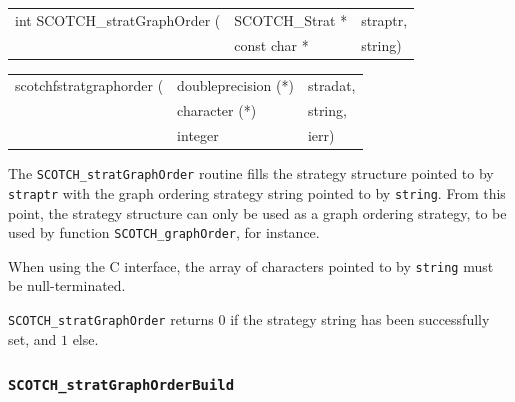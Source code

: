 \begin{itemize}
\progsyn

{\tt\begin{tabular}{l@{}ll}
int SCOTCH\_stratGraphOrder ( & SCOTCH\_Strat * & straptr, \\
                              & const char *    & string)
\end{tabular}}

{\tt\begin{tabular}{l@{}ll}
scotchfstratgraphorder ( & doubleprecision (*) & stradat, \\
                         & character (*)       & string,  \\
                         & integer             & ierr)
\end{tabular}}

\progdes

The {\tt SCOTCH\_stratGraphOrder} routine fills the strategy
structure pointed to by {\tt straptr} with the graph ordering
strategy string pointed to by {\tt string}. From this point,
the strategy structure can only be used as a graph ordering
strategy, to be used by function
{\tt SCOTCH\_\lbt graph\lbt Order}, for instance.

When using the C interface, the array of characters pointed to by
{\tt string} must be null-terminated.

\progret

{\tt SCOTCH\_stratGraphOrder} returns $0$ if the strategy string
has been successfully set, and $1$ else.
\end{itemize}

\subsubsection{{\tt SCOTCH\_stratGraphOrderBuild}}

